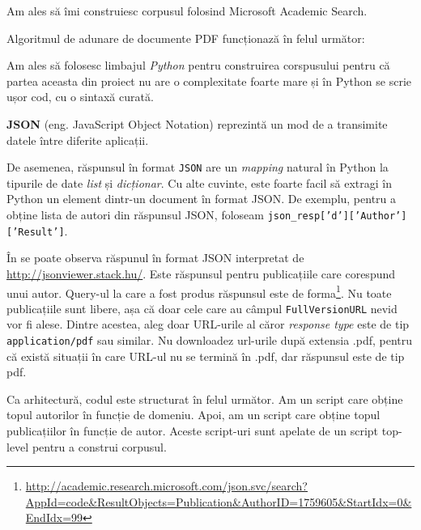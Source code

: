 \begin{description}
Am ales să îmi construiesc corpusul folosind Microsoft Academic Search.


Algoritmul de adunare de documente PDF funcționază în felul următor:

\lstset{language=python}
\lstset{caption=Funcționarea downloader-ului pt MS Academic Search, label=lst:ms-academic-download}


Am ales să folosesc limbajul \textit{Python} pentru construirea corspusului pentru că partea aceasta din proiect nu are o complexitate foarte mare și în Python se scrie ușor cod, cu o sintaxă curată.


\textbf{JSON} (eng. JavaScript Object Notation)  reprezintă un mod de a transimite datele între diferite aplicații.

De asemenea, răspunsul în format \texttt{JSON} are un \textit{mapping} natural în Python la tipurile de date \textit{list} și \textit{dicționar}. Cu alte cuvinte, este foarte facil să extragi în Python un element dintr-un document în format JSON. De exemplu, pentru a obține lista de autori din răspunsul JSON, foloseam \texttt{json\_resp['d']['Author']['Result']}.


În  se poate observa răspunul în format JSON interpretat de \url{http://jsonviewer.stack.hu/}. Este răspunsul pentru publicațiile care corespund unui autor. Query-ul la care a fost produs răspunsul este de forma\footnote{\url{http://academic.research.microsoft.com/json.svc/search?AppId=code&ResultObjects=Publication&AuthorID=1759605&StartIdx=0&EndIdx=99}}. Nu toate publicațiile sunt libere, așa că doar cele care au câmpul \texttt{FullVersionURL} nevid vor fi alese. Dintre acestea, aleg doar URL-urile al căror \textit{response type} este de tip \texttt{application/pdf} sau similar. Nu downloadez url-urile după extensia .pdf, pentru că există situații în care URL-ul nu se termină în .pdf, dar răspunsul este de tip pdf.

Ca arhitectură, codul este structurat în felul următor. Am un script care obține topul autorilor în funcție de domeniu. Apoi, am un script care obține topul publicațiilor în funcție de autor. Aceste script-uri sunt apelate de un script top-level pentru a construi corpusul.

\end{description}

